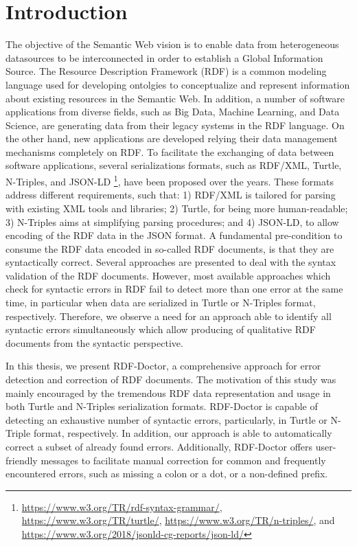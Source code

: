 
\chapter{Introduction}
\label{ch:introduction}

The objective of the Semantic Web vision is to enable data from heterogeneous datasources to be interconnected in order to establish a Global Information Source. 
The Resource Description Framework (RDF) is a common modeling language used for developing ontolgies to conceptualize and represent information about existing resources in the Semantic Web.
In addition, a number of software applications from diverse fields, such as Big Data, Machine Learning, and Data Science, are generating data from their legacy systems in the RDF language. 
On the other hand, new applications are developed relying their data management mechanisms completely on RDF.
To facilitate the exchanging of data between software applications, several serializations formats, such as RDF{/}XML, Turtle, N-Triples, and JSON-LD \footnote{\url{https://www.w3.org/TR/rdf-syntax-grammar/}, \url{https://www.w3.org/TR/turtle/}, \url{https://www.w3.org/TR/n-triples/}, and \url{https://www.w3.org/2018/jsonld-cg-reports/json-ld/}}, have been proposed over the years.
These formats address different requirements, such that: 1) RDF{/}XML is tailored for parsing with existing XML tools and libraries; 2) Turtle, for being more human-readable; 3) N-Triples aims at simplifying parsing procedures; and 4) JSON-LD, to allow encoding of the RDF data in the JSON format.
A fundamental pre-condition to consume the RDF data encoded in so-called RDF documents, is that they are syntactically correct.
Several approaches are presented to deal with the syntax validation of the RDF documents.
However, most available approaches which check for syntactic errors in RDF fail to detect more than one error at the same time, in particular when data are serialized in Turtle or N-Triples format, respectively. 
Therefore, we observe a need for an approach able to identify all syntactic errors simultaneously which allow producing of qualitative RDF documents from the syntactic perspective.

In this thesis, we present RDF-Doctor, a comprehensive approach for error detection and correction of RDF documents.
The motivation of this study was mainly encouraged by the  tremendous RDF data representation and usage in both Turtle and N-Triples serialization formats.
RDF-Doctor is capable of detecting an exhaustive number of syntactic errors, particularly, in Turtle or N-Triple format, respectively. 
In addition, our approach is able to automatically correct a subset of already found errors.
Additionally, RDF-Doctor offers user-friendly messages to facilitate manual correction for common and frequently encountered errors, such as missing a colon or a dot, or a non-defined prefix.  

